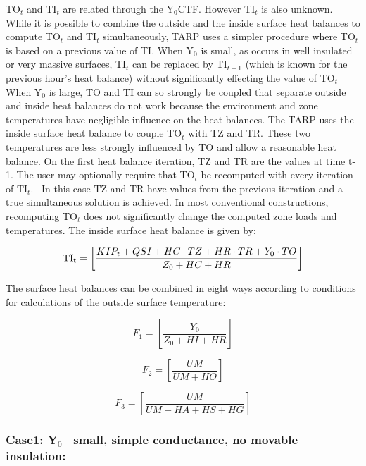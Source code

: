 TO\(_{t}\) and TI\(_{t}\) are related through the Y\(_{0}\)CTF. However TI\(_{t}\) is also unknown. While it is possible to combine the outside and the inside surface heat balances to compute TO\(_{t}\) and TI\(_{t}\) simultaneously, TARP uses a simpler procedure where TO\(_{t}\) is based on a previous value of TI. When Y\(_{0}\) is small, as occurs in well insulated or very massive surfaces, TI\(_{t}\) can be replaced by TI\(_{t-1}\) (which is known for the previous hour's heat balance) without significantly effecting the value of TO\(_{t}\) When Y\(_{0}\) is large, TO and TI can so strongly be coupled that separate outside and inside heat balances do not work because the environment and zone temperatures have negligible influence on the heat balances. The TARP uses the inside surface heat balance to couple TO\(_{t}\) with TZ and TR. These two temperatures are less strongly influenced by TO and allow a reasonable heat balance. On the first heat balance iteration, TZ and TR are the values at time t-1. The user may optionally require that TO\(_{t}\) be recomputed with every iteration of TI\(_{t}\). ~In this case TZ and TR have values from the previous iteration and a true simultaneous solution is achieved. In most conventional constructions, recomputing TO\(_{t}\) does not significantly change the computed zone loads and temperatures. The inside surface heat balance is given by:

\begin{equation}
{\rm{T}}{{\rm{I}}_{\rm{t}}} = \left[ {\frac{{KI{P_t} + QSI + HC\cdot TZ + HR\cdot TR + {Y_0}\cdot TO}}{{{Z_0} + HC + HR}}} \right]
\label{eq:InsideSurfTempHeatBalEq}
\end{equation}

The surface heat balances can be combined in eight ways according to conditions for calculations of the outside surface temperature:

\begin{equation}
{F_1} = \left[ {\frac{{{Y_0}}}{{{Z_0} + HI + HR}}} \right]
\end{equation}

\begin{equation}
{F_2} = \left[ {\frac{{UM}}{{UM + HO}}} \right]
\end{equation}

\begin{equation}
{F_3} = \left[ {\frac{{UM}}{{UM + HA + HS + HG}}} \right]
\end{equation}

\subsubsection{Case1: Y\(_{0}\)~ small, simple conductance, no movable insulation:}\label{case1-yux5f0-small-simple-conductance-no-movable-insulation}

